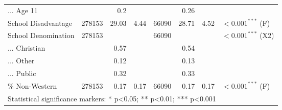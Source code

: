 \begin{table}[!htbp]
{\begin{tabular}{lrrrrrrl}
... Age 11 &  & 0.2 &  &  & 0.26 &  &  \\ 
School Disadvantage & 278153 & 29.03 & 4.44 & 66090 & 28.71 & 4.52 & $<0.001^{***}$ (F) \\ 
School Denomination & 278153 &  &  & 66090 &  &  & $<0.001^{***}$ (X2) \\ 
... Christian &  & 0.57 &  &  & 0.54 &  &  \\ 
... Other &  & 0.12 &  &  & 0.13 &  &  \\ 
... Public &  & 0.32 &  &  & 0.33 &  &  \\ 
\% Non-Western & 278153 & 0.17 & 0.17 & 66090 & 0.17 & 0.17 & $<0.001^{***}$ (F)\\ 
\hline
\hline
\multicolumn{8}{l}{Statistical significance markers: * p<0.05; ** p<0.01; *** p<0.001}\\ 
\end{tabular}
}
\end{table}

